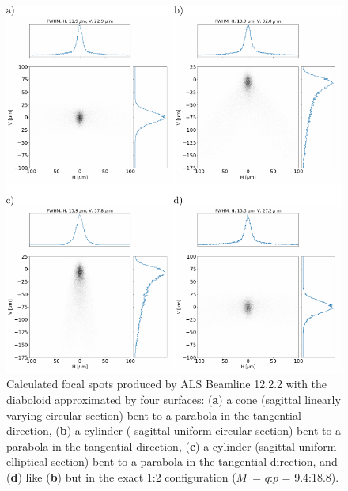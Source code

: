 \documentclass[preprint]{iucr}       %
\newcommand{\inred}[1]{{\color{red}#1}}
\begin{document}
\begin{figure}\label{fig:finalcomparison}
\includegraphics[width=1.0\textwidth]{figures/fig9.pdf}
% 


\caption{Calculated focal spots produced by ALS Beamline 12.2.2 with the diaboloid approximated by four surfaces: (\textbf{a}) a cone (\inred{sagittal linearly varying} circular section) bent to a parabola \inred{in the tangential direction}, (\textbf{b}) a cylinder (\inred{ sagittal uniform} circular section) bent to a parabola in the tangential direction, (\textbf{c}) a cylinder (\inred{sagittal uniform} elliptical section) bent to a parabola \inred{in the tangential direction}, and (\textbf{d}) like (\textbf{b}) but in the exact 1:2 configuration ($M$~= $q$:$p$ = 9.4:18.8).}
\end{figure}
\end{document}
